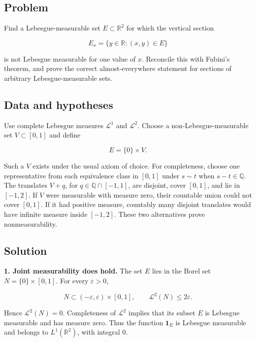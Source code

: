 \documentclass[
  11pt,
]{article}
\begin{document}
\subsection{Problem}\label{problem-2}

Find a Lebesgue-measurable set \(E\subset\mathbb R^2\) for which the
vertical section

\[
E_x=\{y\in\mathbb R:(x,y)\in E\}
\]

is not Lebesgue measurable for one value of \(x\). Reconcile this with
Fubini's theorem, and prove the correct almost-everywhere statement for
sections of arbitrary Lebesgue-measurable sets.

\subsection{Data and hypotheses}\label{data-and-hypotheses-2}

Use complete Lebesgue measures \(\mathcal L^1\) and \(\mathcal L^2\).
Choose a non-Lebesgue-measurable set \(V\subset[0,1]\) and define

\[
E=\{0\}\times V.
\]

Such a \(V\) exists under the usual axiom of choice. For completeness,
choose one representative from each equivalence class in \([0,1]\) under
\(s\sim t\) when \(s-t\in\mathbb Q\). The translates \(V+q\), for
\(q\in\mathbb Q\cap[-1,1]\), are disjoint, cover \([0,1]\), and lie in
\([-1,2]\). If \(V\) were measurable with measure zero, their countable
union could not cover \([0,1]\). If it had positive measure, countably
many disjoint translates would have infinite measure inside \([-1,2]\).
These two alternatives prove nonmeasurability.

\subsection{Solution}\label{solution-2}

\textbf{1. Joint measurability does hold.} The set \(E\) lies in the
Borel set \(N=\{0\}\times[0,1]\). For every \(\varepsilon>0\),

\[
N\subset(-\varepsilon,\varepsilon)\times[0,1],
\qquad \mathcal L^2(N)\leq2\varepsilon.
\]

Hence \(\mathcal L^2(N)=0\). Completeness of \(\mathcal L^2\) implies
that its subset \(E\) is Lebesgue measurable and has measure zero. Thus
the function \(\mathbf 1_E\) is Lebesgue measurable and belongs to
\(L^1(\mathbb R^2)\), with integral \(0\).
\end{document}
